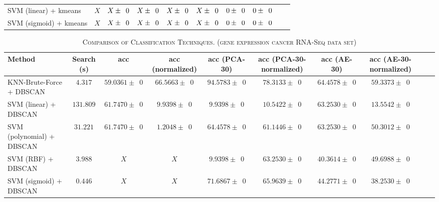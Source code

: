 \documentclass[twocolumn,10pt]{article}
\begin{document}
\begin{table*}[htb]
\begin{tabular}{@{}lccccccccl@{}}
    SVM (linear) + kmeans     & $X$        & $X \pm \z{0}$                     & $X \pm \z{0}$           & $X \pm \z{0}$                  & $X \pm \z{0}$         & $0 \pm \z{0}$                    & $0 \pm \z{0}$\\
    SVM (sigmoid) + kmeans    & $X$        & $X \pm \z{0}$                     & $X \pm \z{0}$           & $X \pm \z{0}$                  & $X \pm \z{0}$         & $0 \pm \z{0}$                    & $0 \pm \z{0}$\\
    \bottomrule
    \end{tabular}
    \label{table:Arrhythmia_result}
      \vspace{-\baselineskip}
  \end{table*}

  \begin{table*}[htb]
    \newcommand{\z}{\phantom{0}}
    \caption{\textsc{Comparison of Classification Techniques. (gene expression cancer RNA-Seq data set)}}
      \vspace{-\baselineskip}
    \begin{tabular}{@{}lccccccccl@{}}\toprule
    Method                    & Search (s) & acc                               & acc (normalized)             & acc (PCA-30)                & acc (PCA-30-normalized)    & acc (AE-30)            & acc (AE-30-normalized)\\ \midrule
    KNN-Brute-Force + DBSCAN  & $4.317$    & $59.0361 \pm \z{0}$               & $66.5663 \pm \z{0}$          & $94.5783 \pm \z{0}$         & $78.3133 \pm \z{0}$        & $64.4578 \pm \z{0}$    & $59.3373 \pm \z{0}$\\
    SVM (linear) + DBSCAN     & $131.809$  & $61.7470 \pm \z{0}$               & $9.9398 \pm \z{0}$           & $9.9398 \pm \z{0}$          & $10.5422 \pm \z{0}$         & $63.2530 \pm \z{0}$    & $13.5542 \pm \z{0}$\\
    SVM (polynomial) + DBSCAN & $31.221$   & $61.7470 \pm \z{0}$               & $1.2048 \pm \z{0}$           & $64.4578 \pm \z{0}$         & $61.1446 \pm \z{0}$        & $63.2530 \pm \z{0}$    & $50.3012 \pm \z{0}$\\
    SVM (RBF) + DBSCAN        & $3.988$    & $X$                               & $X$                          & $9.9398 \pm \z{0}$          & $63.2530 \pm \z{0}$        & $40.3614 \pm \z{0}$    & $49.6988 \pm \z{0}$\\
    SVM (sigmoid) + DBSCAN    & $0.446$    & $X$                               & $X$                          & $71.6867 \pm \z{0}$         & $65.9639 \pm \z{0}$        & $44.2771 \pm \z{0}$    & $38.2530 \pm \z{0}$\\

\end{tabular}
\end{table*}
\end{document}
